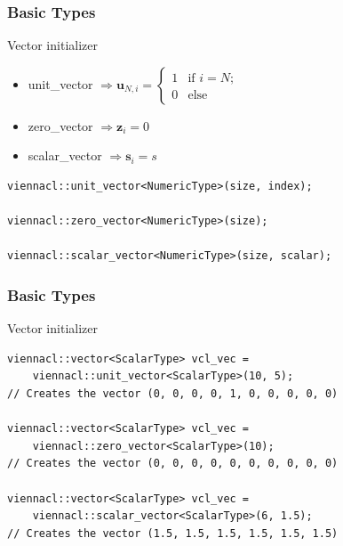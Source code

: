 \begin{frame}[fragile]
\frametitle{Basic Types}

\begin{block}{Vector initializer}  
  \begin{itemize}
   \item unit\_vector $\Rightarrow \textbf{u}_{N,i} = \left\{ \begin{array}{ll} 1 & \mbox{if $i = N$}; \\
                                                                     0 &  \mbox{else} \end{array} \right.$
   \item zero\_vector $\Rightarrow \textbf{z}_i = 0$
   \item scalar\_vector $\Rightarrow \textbf{s}_i = s$
  \end{itemize}
  
  \begin{lstlisting}
viennacl::unit_vector<NumericType>(size, index);
    
viennacl::zero_vector<NumericType>(size);
    
viennacl::scalar_vector<NumericType>(size, scalar);
  \end{lstlisting}
\end{block}

\end{frame}



\begin{frame}[fragile]
\frametitle{Basic Types}

\begin{block}{Vector initializer}
  \begin{lstlisting}
viennacl::vector<ScalarType> vcl_vec =
    viennacl::unit_vector<ScalarType>(10, 5);
// Creates the vector (0, 0, 0, 0, 1, 0, 0, 0, 0, 0)

viennacl::vector<ScalarType> vcl_vec =
    viennacl::zero_vector<ScalarType>(10);
// Creates the vector (0, 0, 0, 0, 0, 0, 0, 0, 0, 0)

viennacl::vector<ScalarType> vcl_vec =
    viennacl::scalar_vector<ScalarType>(6, 1.5);
// Creates the vector (1.5, 1.5, 1.5, 1.5, 1.5, 1.5)
  \end{lstlisting}
\end{block}

\end{frame}



